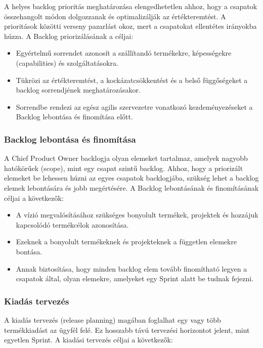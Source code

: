 \documentclass[12pt,a4paper,parskip=full]{scrartcl}
\begin{document}
A helyes backlog prioritás meghatározása elengedhetetlen ahhoz, hogy a csapatok összehangolt módon dolgozzanak és optimalizálják az értékteremtést. A prioritások közötti verseny pazarlást okoz, mert a csapatokat ellentétes irányokba húzza. A Backlog priorizálásának a céljai:

\begin{itemize}
\itemsep1pt\parskip0pt
\item
 Egyértelmű sorrendet azonosít a szállítandó termékekre, képességekre (capabilities) és szolgáltatásokra.
\item
 Tükrözi az értékteremtést, a kockázatcsökkentést és a belső függőségeket a backlog sorrendjének meghatározásakor.
\item
 Sorrendbe rendezi az egész agilis szervezetre vonatkozó kezdeményezéseket a Backlog lebontása és finomítása előtt.
\end{itemize}

\subsubsection{Backlog lebontása és finomítása}\label{backlog-decomposition-and-refinement}

A Chief Product Owner backlogja olyan elemeket tartalmaz, amelyek nagyobb hatókörűek (scope), mint egy csapat szintű backlog. Ahhoz, hogy a priorizált elemeket be lehessen húzni az egyes csapatok backlogjába, szükség lehet a backlog elemek lebontására és jobb megértésére. A Backlog lebontásának és finomításának céljai a következők:

\begin{itemize}
\itemsep1pt\parskip0pt
\item
 A vízió megvalósításához szükséges bonyolult termékek, projektek és hozzájuk kapcsolódó termékcélok azonosítása.
\item
 Ezeknek a bonyolult termékeknek és projekteknek a független elemekre bontása.
\item
 Annak biztosítása, hogy minden backlog elem tovább finomítható legyen a csapatok által, olyan elemekre, amelyeket egy Sprint alatt be tudnak fejezni.
\end{itemize}

\subsubsection{Kiadás tervezés}\label{Release-planning}

A kiadás tervezés (release planning) magában foglalhat egy vagy több termékkiadást az ügyfél felé. Ez hosszabb távú tervezési horizontot jelent, mint egyetlen Sprint. A kiadási tervezés céljai a következők:
\end{document}
